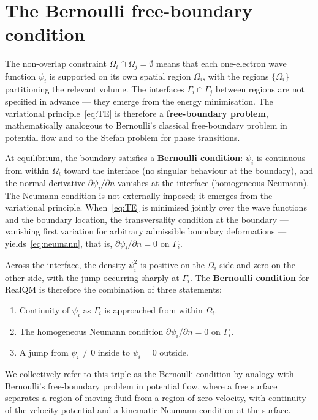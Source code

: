 \section{The Bernoulli free-boundary condition}\label{sec:bernoulli}

The non-overlap constraint $\Omega_i \cap \Omega_j = \emptyset$ means that each one-electron wave function $\psi_i$ is supported on its own spatial region $\Omega_i$, with the regions $\{\Omega_i\}$ partitioning the relevant volume. The interfaces $\Gamma_i \cap \Gamma_j$ between regions are not specified in advance --- they emerge from the energy minimisation. The variational principle~\eqref{eq:TE} is therefore a \textbf{free-boundary problem}, mathematically analogous to Bernoulli's classical free-boundary problem in potential flow and to the Stefan problem for phase transitions.

At equilibrium, the boundary satisfies a \textbf{Bernoulli condition}: $\psi_i$ is continuous from within $\Omega_i$ toward the interface (no singular behaviour at the boundary), and the normal derivative $\partial \psi_i / \partial n$ vanishes at the interface (homogeneous Neumann). The Neumann condition is not externally imposed; it emerges from the variational principle. When~\eqref{eq:TE} is minimised jointly over the wave functions and the boundary location, the transversality condition at the boundary --- vanishing first variation for arbitrary admissible boundary deformations --- yields~\eqref{eq:neumann}, that is, $\partial \psi_i / \partial n = 0$ on $\Gamma_i$.

Across the interface, the density $\psi_i^2$ is positive on the $\Omega_i$ side and zero on the other side, with the jump occurring sharply at $\Gamma_i$. The \textbf{Bernoulli condition} for RealQM is therefore the combination of three statements:
\begin{enumerate}
\item Continuity of $\psi_i$ as $\Gamma_i$ is approached from within $\Omega_i$.
\item The homogeneous Neumann condition $\partial \psi_i / \partial n = 0$ on $\Gamma_i$.
\item A jump from $\psi_i \ne 0$ inside to $\psi_i = 0$ outside.
\end{enumerate}
We collectively refer to this triple as the Bernoulli condition by analogy with Bernoulli's free-boundary problem in potential flow, where a free surface separates a region of moving fluid from a region of zero velocity, with continuity of the velocity potential and a kinematic Neumann condition at the surface.

